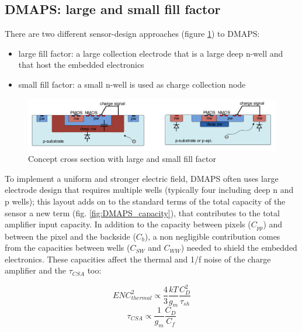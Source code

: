    \subsection{DMAPS: large and small fill factor}
      There are two different sensor-design approaches (figure \ref{fig:large_small_sensor_scheme})
      to DMAPS:
      \begin{itemize}
         \item large fill factor: a large collection electrode that is a large deep n-well
      and that host the embedded electronics
         \item small fill factor: a small n-well is used as charge collection node
      \end{itemize}
      \begin{figure}
         \centering\includegraphics[width=12cm]{figures/Pixel_detectors/large_small_sensor_scheme.png}
         \caption{Concept cross section with large and small fill factor}
         \label{fig:large_small_sensor_scheme}
      \end{figure}
      To implement a uniform and stronger electric field, DMAPS often uses large electrode design that requires multiple wells (typically four including deep n and p wells); this layout adds on to the standard terms of the total capacity of the sensor a new term (fig. \ref{fig:DMAPS_capacity}), that contributes to the total amplifier input capacity. In addition to the capacity between pixels ($C_{pp}$) and between the pixel and the backside ($C_{b}$), a non negligible contribution comes from the capacities between wells ($C_{SW}$ and $C_{WW}$) needed to shield the embedded electronics. These capacities affect the thermal and 1/f noise of the charge amplifier and the $ \tau_{CSA}$ too:
      \begin{multicols}{2}
         \begin{equation}
            ENC^2 _ {thermal} \propto \frac{4}{3}\frac{kT}{g_m}\frac{C_D ^2}{\tau_{sh}}
         \end{equation}\quad 
         \begin{equation}
            \tau_{CSA} \propto \frac{1}{g_m}\frac{C_D}{C_f}
         \end{equation}
      \end{multicols} 

